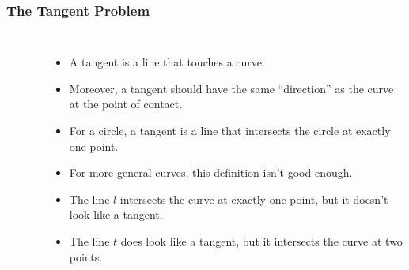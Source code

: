 \begin{frame}
\frametitle{The Tangent Problem}
\begin{columns}[c]
\ %

\ %
\begin{itemize}
\item<2->  A tangent is a line that touches a curve.
\item<3->  Moreover, a tangent should have the same ``direction'' as the curve at the point of contact.
\item<4->  For a circle, a tangent is a line that intersects the circle at exactly one point.
\item<5->  For more general curves, this definition isn't good enough.
\item<6->  The line $l$ intersects the curve at exactly one point, but it doesn't look like a tangent.
\item<7->  The line $t$ does look like a tangent, but it intersects the curve at two points.
\end{itemize}
\end{columns}
\end{frame}
